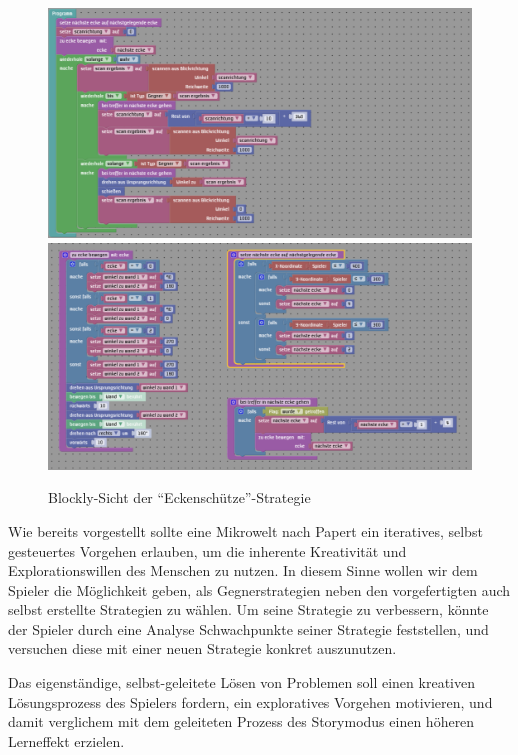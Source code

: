 \begin{figure}
  \centering
  \label{strategie-sniper}
  \includegraphics[scale=1, keepaspectratio]{figures/strategy-sniper-1.png}
  \includegraphics[scale=1, keepaspectratio]{figures/strategy-sniper-2.png}
  \caption{Blockly-Sicht der \enquote{Eckenschütze}-Strategie}
\end{figure}

Wie bereits vorgestellt sollte eine Mikrowelt nach Papert ein iteratives, selbst gesteuertes Vorgehen
erlauben, um die inherente Kreativität und Explorationswillen des Menschen zu nutzen. In diesem
Sinne wollen wir dem Spieler die Möglichkeit geben, als Gegnerstrategien neben den vorgefertigten
auch selbst erstellte Strategien zu wählen. Um seine Strategie zu verbessern, könnte der Spieler
durch eine Analyse Schwachpunkte seiner Strategie feststellen, und versuchen diese mit einer neuen
Strategie konkret auszunutzen.

Das eigenständige, selbst-geleitete Lösen von Problemen soll einen kreativen Lösungsprozess des
Spielers fordern, ein exploratives Vorgehen motivieren, und damit verglichem mit dem geleiteten
Prozess des Storymodus einen höheren Lerneffekt erzielen.

